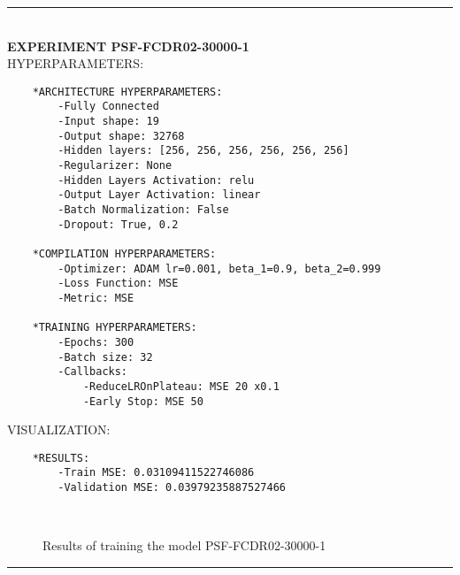\rule{0.5\textwidth}{0.5pt}\\

	{\large \textbf{EXPERIMENT PSF-FCDR02-30000-1}}\\
	
	{\normalsize HYPERPARAMETERS:}
	\begin{lstlisting}	
	*ARCHITECTURE HYPERPARAMETERS:
		-Fully Connected
		-Input shape: 19
		-Output shape: 32768
		-Hidden layers: [256, 256, 256, 256, 256, 256]
		-Regularizer: None
		-Hidden Layers Activation: relu
		-Output Layer Activation: linear
		-Batch Normalization: False
		-Dropout: True, 0.2
	
	*COMPILATION HYPERPARAMETERS:
		-Optimizer: ADAM lr=0.001, beta_1=0.9, beta_2=0.999
		-Loss Function: MSE
		-Metric: MSE
	
	*TRAINING HYPERPARAMETERS:
		-Epochs: 300
		-Batch size: 32
		-Callbacks: 
			-ReduceLROnPlateau: MSE 20 x0.1
			-Early Stop: MSE 50
	\end{lstlisting}
	
	{\normalsize VISUALIZATION:}
	\begin{lstlisting}
	*RESULTS:
        -Train MSE: 0.03109411522746086
        -Validation MSE: 0.03979235887527466
	\end{lstlisting}
	
	\begin{figure*}[ht!]
		\hspace{\fill}
		\hspace{\fill}
		\\
		\caption{Results of training the model PSF-FCDR02-30000-1}
	\end{figure*}
	
\FloatBarrier	
\rule{0.5\textwidth}{0.5pt}\\